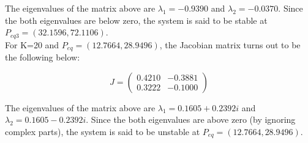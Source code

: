 \documentclass{article}
\begin{document}
The eigenvalues of the matrix above are $\lambda_1=-0.9390$ and $\lambda_2=-0.0370$. Since the both eigenvalues are below zero, the system is said to be stable at $P_{eq3}=(32.1596, 72.1106)$.\\


For K=20 and $P_{eq}=(12.7664,28.9496)$, the Jacobian matrix turns out to be the following below:
\textbf{}
\begin{large}\[
 J=
\left ( \begin{array}{cc}
0.4210 & -0.3881 \\
0.3222 & -0.1000
\end{array} \right )
\]\end{large}

The eigenvalues of the matrix above are $\lambda_1=0.1605+0.2392i$ and $\lambda_2=0.1605-0.2392i$. Since the both eigenvalues are above zero (by ignoring complex parts), the system is said to be unstable at $P_{eq}=(12.7664,28.9496)$.
\end{document}
